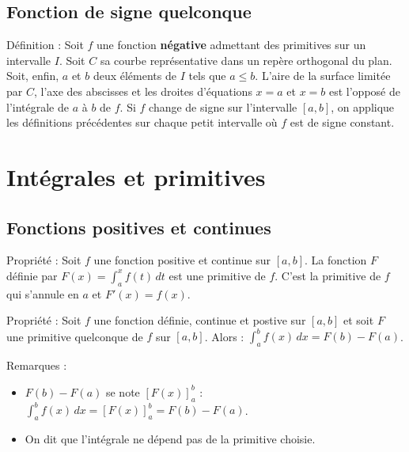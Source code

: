 \documentclass[11pt,a4paper]{article}
\begin{document}
\subsection{Fonction de signe quelconque}

\begin{boiteDef}{Définition :}
    Soit $f$ une fonction \textbf{négative} admettant des primitives sur un intervalle $I$.
    \newline
    Soit $C$ sa courbe représentative dans un repère orthogonal du plan.
    \newline
    Soit, enfin, $a$ et $b$ deux éléments de $I$ tels que $a \leq b$.
    \newline
    L'aire de la surface limitée par $C$, l'axe des abscisses et les droites d'équations $x=a$ et $x=b$ est l'opposé de l'intégrale de $a$ à $b$ de $f$.
    \newline
    Si $f$ change de signe sur l'intervalle $[a,b]$, on applique les définitions précédentes sur chaque petit intervalle où $f$ est de signe constant.
\end{boiteDef}

\section{Intégrales et primitives}

\subsection{Fonctions positives et continues}

\begin{boiteProp}{Propriété :}
    Soit $f$ une fonction positive et continue sur $[a,b]$. La fonction $F$ définie par $F(x) = \displaystyle \int_a^x f(t) \, dt$ est une primitive de $f$. C'est la primitive de $f$ qui s'annule en $a$ et $F'(x) = f(x)$.
\end{boiteProp}

\begin{boiteProp}{Propriété :}
    Soit $f$ une fonction définie, continue et postive sur $[a,b]$ et soit $F$ une primitive quelconque de $f$ sur $[a,b]$.
    \newline
    Alors : $\displaystyle \int_a^b f(x) \, dx = F(b) - F(a)$.
\end{boiteProp}

\begin{boiteRemarque}{Remarques :}
    \begin{itemize}
        \item $F(b) - F(a)$ se note $[F(x)]_a^b$ : $\displaystyle \int_a^b f(x) \, dx = [F(x)]_a^b = F(b) - F(a)$.
        \item On dit que l'intégrale ne dépend pas de la primitive choisie.
    \end{itemize}
\end{boiteRemarque}
\end{document}
